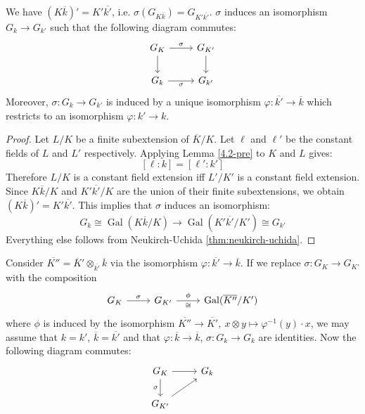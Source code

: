 \begin{lemma}\label{4.2}
We have $(K\overline{k})'=K'\overline{k'}$, i.e. $\sigma(G_{K\overline{k}})=G_{K'\overline{k'}}$. $\sigma$ induces an isomorphism $G_k\to G_{k'}$ such that the following diagram commutes:
\[ \begin{tikzcd}
G_K \ar[r, "\sigma"] \ar[d] & G_{K'}\ar[d]\\
G_k \ar[r, "\sigma"'] & G_{k'}
\end{tikzcd} \]
Moreover, $\sigma:G_k\to G_{k'}$ is induced by a unique isomorphism $\varphi:\overline{k'}\to\overline{k}$ which restricts to an isomorphism $\varphi: k'\to k$.
\end{lemma}

\begin{proof}
Let $L/K$ be a finite subextension of $\overline{K}/K$. Let $\ell$ and $\ell'$ be the constant fields of $L$ and $L'$ respectively. Applying Lemma \ref{4.2-pre} to $K$ and $L$ gives:
\[ [\ell:k] = [\ell':k'] \]
Therefore $L/K$ is a constant field extension iff $L'/K'$ is a constant field extension. Since $K\overline{k}/K$ and $K'\overline{k'}/K$ are the union of their finite subextensions, we obtain $(K\overline{k})' = K'\overline{k'}$. This implies that $\sigma$ induces an isomorphism:
\[G_k \cong \operatorname{Gal}(K\overline{k}/K) \to \operatorname{Gal}(K'\overline{k'}/K')\cong G_{k'}\] 
Everything else follows from Neukirch-Uchida \ref{thm:neukirch-uchida}.
\end{proof}

\begin{remark}
Consider $\overline{K''} = \overline{K}'\otimes_{\overline{k'}}\overline{k}$ via the isomorphism $\varphi: \overline{k'}\to \overline{k}$. If we replace $\sigma: G_K\to G_{K'}$ with the composition
\[ \begin{tikzcd}
G_K \ar[r, "\sigma"] & G_{K'} \ar[r, "\phi", "\cong"'] & \operatorname{Gal}(\overline{K''}/K')
\end{tikzcd} \]
where $\phi$ is induced by the isomorphism $\overline{K''}\to\overline{K'},\ x\otimes y\mapsto \varphi^{-1}(y)\cdot x$, we may assume that $k=k'$, $\overline{k} = \overline{k'}$ and that $\varphi:\overline{k}\to\overline{k}$, $\sigma: G_k\to G_k$ are identities. Now the following diagram commutes:
\[ \begin{tikzcd}
G_K \ar[r]\ar[d, "\sigma"'] & G_k\\
G_{K'}\ar[ru]
\end{tikzcd} \]
\end{remark}

